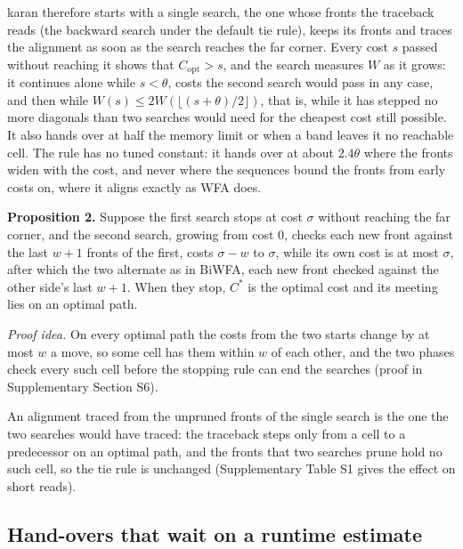 karan therefore starts with a single search, the one whose fronts the traceback reads (the backward search under the default tie rule), keeps its fronts and traces the alignment as soon as the search reaches the far corner. Every cost \(s\) passed without reaching it shows that \(C_{\mathrm{opt}} > s\), and the search measures \(W\) as it grows: it continues alone while \(s < \theta\), costs the second search would pass in any case, and then while \(W(s) \le 2W(\lfloor (s+\theta)/2 \rfloor)\), that is, while it has stepped no more diagonals than two searches would need for the cheapest cost still possible. It also hands over at half the memory limit or when a band leaves it no reachable cell. The rule has no tuned constant: it hands over at about \(2.4\theta\) where the fronts widen with the cost, and never where the sequences bound the fronts from early costs on, where it aligns exactly as WFA does.

\textbf{Proposition 2.} Suppose the first search stops at cost \(\sigma\) without reaching the far corner, and the second search, growing from cost 0, checks each new front against the last \(w+1\) fronts of the first, costs \(\sigma-w\) to \(\sigma\), while its own cost is at most \(\sigma\), after which the two alternate as in BiWFA, each new front checked against the other side's last \(w+1\). When they stop, \(C^*\) is the optimal cost and its meeting lies on an optimal path.

\emph{Proof idea.} On every optimal path the costs from the two starts change by at most \(w\) a move, so some cell has them within \(w\) of each other, and the two phases check every such cell before the stopping rule can end the searches (proof in Supplementary Section S6).

An alignment traced from the unpruned fronts of the single search is the one the two searches would have traced: the traceback steps only from a cell to a predecessor on an optimal path, and the fronts that two searches prune hold no such cell, so the tie rule is unchanged (Supplementary Table S1 gives the effect on short reads).

\subsection{Hand-overs that wait on a runtime estimate}

